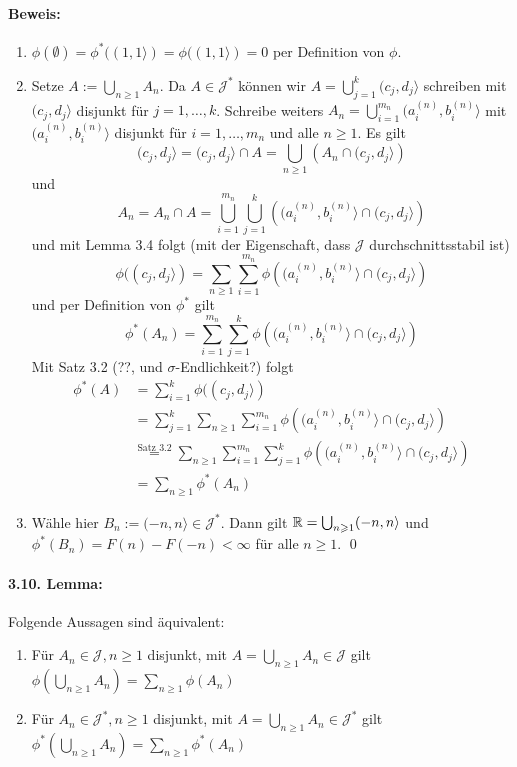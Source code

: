 \documentclass[12pt]{report}
\begin{document}
\paragraph{Beweis:}
\begin{enumerate}[label=(\roman*)]
    \item $\phi(\emptyset)=\phi^*((1,1\rangle)=\phi((1,1\rangle)=0$ per Definition von $\phi$.
    \item Setze $A:=\bigcup_{n\geq1}A_n$. Da $A\in\mathcal{J}^*$ k\"onnen wir $A=\bigcup_{j=1}^k(c_j,d_j\rangle$ schreiben mit $(c_j,d_j\rangle$ disjunkt f\"ur $j=1,\hdots,k$. Schreibe weiters $A_n=\bigcup_{i=1}^{m_n}(a_i^{(n)},b_i^{(n)}\rangle$ mit $(a_i^{(n)},b_i^{(n)}\rangle$ disjunkt f\"ur $i=1,\hdots,m_n$ und alle $n\geq1$. Es gilt 
    $$(c_j,d_j\rangle=(c_j,d_j\rangle\cap A=\bigcup_{n\geq1}\left(A_n\cap(c_j,d_j\rangle\right)$$
    und
    $$A_n=A_n\cap A=\bigcup_{i=1}^{m_n}\bigcup_{j=1}^k\left((a_i^{(n)},b_i^{(n)}\rangle\cap(c_j,d_j\rangle\right)$$
    und mit Lemma 3.4 folgt (mit der Eigenschaft, dass $\mathcal{J}$ durchschnittsstabil ist)
    $$\phi((c_j,d_j\rangle)=\sum_{n\geq1}\sum_{i=1}^{m_n}\phi\left((a_i^{(n)},b_i^{(n)}\rangle\cap(c_j,d_j\rangle\right)$$
    und per Definition von $\phi^*$ gilt
    $$\phi^*(A_n)=\sum_{i=1}^{m_n}\sum_{j=1}^k\phi\left((a_i^{(n)},b_i^{(n)}\rangle\cap(c_j,d_j\rangle\right)$$
    Mit Satz 3.2 (??, und $\sigma$-Endlichkeit?) folgt 
    \begin{align*}
        \phi^*(A)&=\sum_{i=1}^k\phi((c_j,d_j\rangle)\\
        &=\sum_{j=1}^k\sum_{n\geq1}\sum_{i=1}^{m_n}\phi\left((a_i^{(n)},b_i^{(n)}\rangle\cap(c_j,d_j\rangle\right)\\
        &\overset{\text{Satz 3.2}}{=}\sum_{n\geq1}\sum_{i=1}^{m_n}\sum_{j=1}^k\phi\left((a_i^{(n)},b_i^{(n)}\rangle\cap(c_j,d_j\rangle\right)\\
        &=\sum_{n\geq1}\phi^*(A_n)
    \end{align*}
    \item W\"ahle hier $B_n:=(-n,n\rangle\in\mathcal{J}^*$. Dann gilt $\mathbb{R}=\bigcup_{n\geqslant1}(-n,n\rangle$ und $\phi^*(B_n)=F(n)-F(-n)<\infty$ f\"ur alle $n\geq1$. \qed
\end{enumerate}

\paragraph{3.10. Lemma:}Folgende Aussagen sind \"aquivalent:
\begin{enumerate}[label=(\roman*)]
    \item F\"ur $A_n\in\mathcal{J},n\geq1$ disjunkt, mit $A=\bigcup_{n\geq1}A_n\in\mathcal{J}$ gilt $\phi\left(\bigcup_{n\geq1}A_n\right)=\sum_{n\geq1}\phi(A_n)$
    \item F\"ur $A_n\in\mathcal{J}^*,n\geq1$ disjunkt, mit $A=\bigcup_{n\geq1}A_n\in\mathcal{J}^*$ gilt $\phi^*\left(\bigcup_{n\geq1}A_n\right)=\sum_{n\geq1}\phi^*(A_n)$
\end{enumerate}
\end{document}

